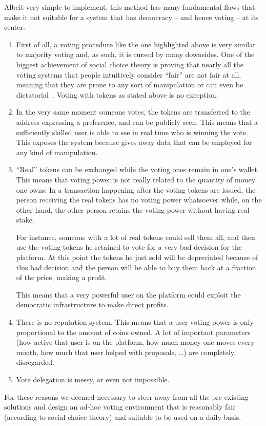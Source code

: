 \documentclass[submission, copyright,creativecommons,sharealike,noncommercial]{eptcs}
\begin{document}
	Albeit very simple to implement, this method has many fundamental flaws that make it not suitable for a system that has democracy -- and hence voting -- at its center:
	\begin{enumerate}	
		\item First of all, a voting procedure like the one highlighted above is very similar to majority voting and, as such, it is cursed by many downsides. One of the biggest achievement of social choice theory is proving that nearly all the voting systems that people intuitively consider ``fair'' are not fair at all, meaning that they are prone to any sort of manipulation or can even be dictatorial~\cite{Arrow1951, Satterthwaite1975, Gibbard1973}. Voting with tokens as stated above is no exception. 
		\item In the very same moment someone votes, the tokens are transferred to the address expressing a preference, and can be publicly seen. This means that a sufficiently skilled user is able to see in real time who is winning the vote. This exposes the system because gives away data that can be employed for any kind of manipulation.
		\item ``Real'' tokens can be exchanged while the voting ones remain in one's wallet. This means that voting power is not really related to the quantity of money one owns: In a transaction happening after the voting tokens are issued, the person receiving the real tokens has no voting power whatsoever while, on the other hand, the other person retains the voting power without having real stake.
		
		For instance, someone with a lot of real tokens could sell them all, and then use the voting tokens he retained to vote for a very bad decision for the platform. At this point the tokens he just sold will be depreciated because of this bad decision and the person will be able to buy them back at a fraction of the price, making a profit. 
		
		This means that a very powerful user on the platform could exploit the democratic infrastructure to make direct profits.
		\item There is no reputation system. This means that a user voting power is only proportional to the amount of coins owned. A lot of important parameters (how active that user is on the platform, how much money one moves every month, how much that user helped with proposals, \dots) are completely disregarded.
		\item Vote delegation is messy, or even not impossible.
	\end{enumerate}
%
	For these reasons we deemed necessary to steer away from all the pre-existing solutions and design an ad-hoc voting environment that is reasonably fair (according to social choice theory) and suitable to be used on a daily basis.
%
%
\end{document}
